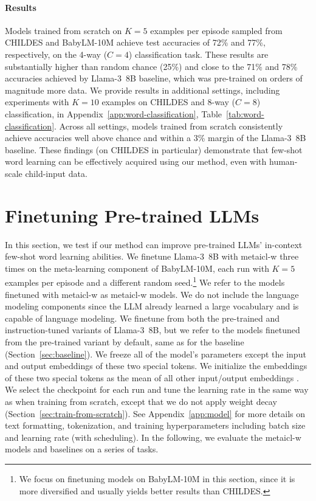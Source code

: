 \documentclass{article}
\begin{document}
\paragraph{Results}
Models trained from scratch on $K=5$ examples per episode sampled from CHILDES and BabyLM-10M achieve test accuracies of 72\% and 77\%, respectively, on the 4-way ($C=4$) classification task.
These results are substantially higher than random chance (25\%) and close to the 71\% and 78\% accuracies achieved by \mbox{Llama-3 8B} baseline, which was pre-trained on orders of magnitude more data.
We provide results in additional settings, including experiments with $K=10$ examples on CHILDES and 8-way ($C=8$) classification, in Appendix~\ref{app:word-classification}, Table~\ref{tab:word-classification}. Across all settings, models trained from scratch consistently achieve accuracies well above chance and within a 3\% margin of the \mbox{Llama-3 8B} baseline.
These findings (on CHILDES in particular) demonstrate that few-shot word learning can be effectively acquired using our method, even with human-scale child-input data.

\section{Finetuning Pre-trained LLMs}
\label{sec:finetuning}

In this section, we test if our method can improve pre-trained LLMs' in-context few-shot word learning abilities.
We finetune \mbox{Llama-3 8B} with \ac{metaicl-w} three times on the meta-learning component of BabyLM-10M, each run with $K=5$ examples per episode and a different random seed.\footnote{We focus on finetuning models on BabyLM-10M in this section, since it is more diversified and usually yields better results than CHILDES.}
We refer to the models finetuned with \ac{metaicl-w} as \ac{metaicl-w} models.
We do not include the language modeling components since the LLM already learned a large vocabulary and is capable of language modeling.
We finetune from both the pre-trained and instruction-tuned variants of \mbox{Llama-3 8B}, but we refer to the models finetuned from the pre-trained variant by default, same as for the baseline (Section~\ref{sec:baseline}).
We freeze all of the model's parameters except the input and output embeddings of these two special tokens. We initialize the embeddings of these two special tokens as the mean of all other input/output embeddings \citep{hewitt2021initializing}.
We select the checkpoint for each run and tune the learning rate in the same way as when training from scratch, except that we do not apply weight decay (Section~\ref{sec:train-from-scratch}).
See Appendix~\ref{app:model} for more details on text formatting, tokenization, and training hyperparameters including batch size and learning rate (with scheduling).
In the following, we evaluate the \ac{metaicl-w} models and baselines on a series of tasks.
\end{document}

